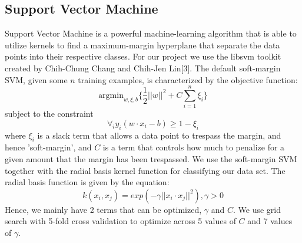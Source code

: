 \documentclass{article} %
\begin{document}
\subsection{Support Vector Machine}

Support Vector Machine is a powerful machine-learning algorithm that is able to utilize kernels to find a maximum-margin hyperplane that separate the data points into their respective classes. For our project we use the libsvm toolkit created by Chih-Chung Chang and Chih-Jen Lin[3]. The default soft-margin SVM, given some $n$ training examples, is characterized by the objective function:
$$\mbox{argmin}_{w, \xi, b}\{\frac{1}{2}||w||^2 + C\sum^n_{i=1}\xi_i\}$$
subject to the constraint
$$\forall_i y_i(w\cdot{x_i}-b) \geq 1 - \xi_i$$
where $\xi_i$ is a slack term that allows a data point to trespass the margin, and hence 'soft-margin', and $C$ is a term that controls how much to penalize for a given amount that the margin has been trespassed. We use the soft-margin SVM together with the radial basis kernel function for classifying our data set. The radial basis function is given by the equation:
$$k(x_i, x_j) = exp(-\gamma||x_i\cdot{x_j}||^2), \gamma > 0$$
Hence, we mainly have 2 terms that can be optimized, $\gamma$ and $C$.
We use grid search with 5-fold cross validation to optimize across 5 values of $C$ and 7 values of $\gamma$.\\
\end{document}
